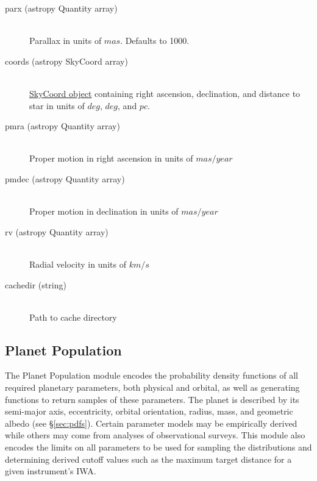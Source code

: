 \documentclass[cleanfoot]{asme2ej}
\begin{document}
\begin{itemize}
\begin{description}
    \item[parx (astropy Quantity array)] \hfill \\ Parallax in units of $ mas $. Defaults to 1000.
    \item[coords (astropy SkyCoord array)] \hfill \\ \href{http://astropy.readthedocs.org/en/latest/api/astropy.coordinates.SkyCoord.html}{SkyCoord object} containing right ascension, declination, and distance to star in units of $ deg $, $ deg $, and $ pc $.
    \item[pmra (astropy Quantity array)] \hfill \\ Proper motion in right ascension in units of $ mas/year $
    \item[pmdec (astropy Quantity array)] \hfill \\ Proper motion in declination in units of $ mas/year $
    \item[rv (astropy Quantity array)] \hfill \\ Radial velocity in units of $ km/s $
    \item[cachedir (string)] \hfill \\ Path to cache directory
\end{description}
\end{itemize}



\subsection{Planet Population}
The Planet Population module encodes the probability density functions of all required planetary parameters, both physical and orbital, as well as generating functions to return samples of these parameters. The planet is described by its semi-major axis, eccentricity, orbital orientation, radius, mass, and geometric albedo (see \S\ref{sec:pdfs}). Certain parameter models may be empirically derived while others may come from analyses of observational surveys.  This module also encodes the limits on all parameters to be used for sampling the distributions and determining derived cutoff values such as the maximum target distance for a given instrument's IWA.
\end{document}
